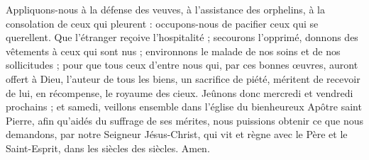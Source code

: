 Appliquons-nous à la défense des veuves, à l’assistance des orphelins, à la consolation de ceux qui pleurent : occupons-nous de pacifier ceux qui se querellent. Que l’étranger reçoive l’hospitalité ; secourons l’opprimé, donnons des vêtements à ceux qui sont nus ; environnons le malade de nos soins et de nos sollicitudes ; pour que tous ceux d’entre nous qui, par ces bonnes œuvres, auront offert à Dieu, l’auteur de tous les biens, un sacrifice de piété, méritent de recevoir de lui, en récompense, le royaume des cieux. Jeûnons donc mercredi et vendredi prochains ; et samedi, veillons ensemble dans l’église du bienheureux Apôtre saint Pierre, afin qu’aidés du suffrage de ses mérites, nous puissions obtenir ce que nous demandons, par notre Seigneur Jésus-Christ, qui vit et règne avec le Père et le Saint-Esprit, dans les siècles des siècles. Amen.